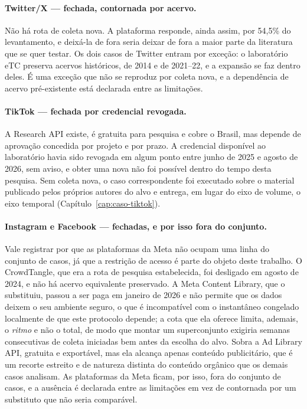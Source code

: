 \paragraph{Twitter/X — fechada, contornada por acervo.} Não há rota de coleta nova.
A plataforma responde, ainda assim, por 54,5\% do levantamento, e deixá-la de fora
seria deixar de fora a maior parte da literatura que se quer testar. Os dois casos
de Twitter entram por exceção: o laboratório eTC preserva acervos históricos, de
2014 e de 2021--22, e a expansão se faz dentro deles. É uma exceção que não se
reproduz por coleta nova, e a dependência de acervo pré-existente está declarada
entre as limitações.

\paragraph{TikTok — fechada por credencial revogada.} A Research API existe, é
gratuita para pesquisa e cobre o Brasil, mas depende de aprovação concedida por
projeto e por prazo. A credencial disponível ao laboratório havia sido revogada em
algum ponto entre junho de 2025 e agosto de 2026, sem aviso, e obter uma nova não
foi possível dentro do tempo desta pesquisa. Sem coleta nova, o caso
correspondente foi executado sobre o material
publicado pelos próprios autores do alvo e entrega, em lugar do eixo de volume, o
eixo temporal (Capítulo~\ref{cap:caso-tiktok}).

\paragraph{Instagram e Facebook — fechadas, e por isso fora do conjunto.} Vale
registrar por que as plataformas da Meta não ocupam uma linha do conjunto de casos,
já que a restrição de acesso é parte do objeto deste trabalho. O CrowdTangle, que
era a rota de pesquisa estabelecida, foi desligado em agosto de 2024, e não há
acervo equivalente preservado. A Meta Content Library, que o substituiu, passou a
ser paga em janeiro de 2026 e não permite que os dados deixem o seu ambiente
seguro, o que é incompatível com o instantâneo congelado localmente de que este
protocolo depende; a cota que ela oferece limita, ademais, o \emph{ritmo} e não o
total, de modo que montar um superconjunto exigiria semanas consecutivas de coleta
iniciadas bem antes da escolha do alvo. Sobra a Ad Library API, gratuita e
exportável, mas ela alcança apenas conteúdo publicitário, que é um recorte estreito
e de natureza distinta do conteúdo orgânico que os demais casos analisam. As
plataformas da Meta ficam, por isso, fora
do conjunto de casos, e a ausência é declarada entre as limitações em vez de
contornada por um substituto que não seria comparável.

